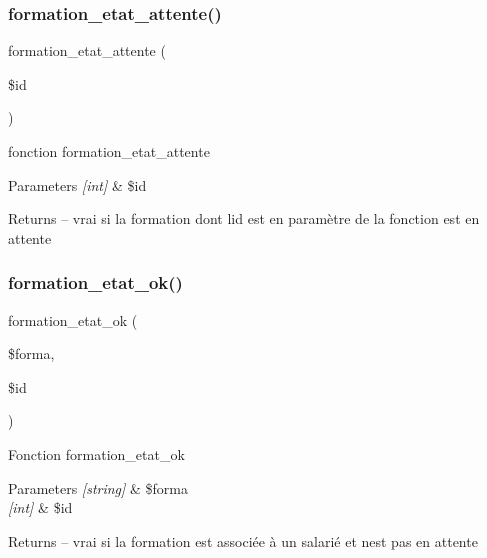 \subsubsection{formation\+\_\+etat\+\_\+attente()}
{\footnotesize\ttfamily formation\+\_\+etat\+\_\+attente (\begin{DoxyParamCaption}\item[{}]{\$id }\end{DoxyParamCaption})}

fonction formation\+\_\+etat\+\_\+attente


\begin{DoxyParams}{Parameters}
{\em \mbox{[}int\mbox{]}} & \$id \\
\hline
\end{DoxyParams}
\begin{DoxyReturn}{Returns}
-- vrai si la formation dont l\textquotesingle{}id est en paramètre de la fonction est en attente 
\end{DoxyReturn}
\mbox{\label{_d_a___formation_8php_aa12612b84ce8697154f9fff827e842be}} 
\subsubsection{formation\+\_\+etat\+\_\+ok()}
{\footnotesize\ttfamily formation\+\_\+etat\+\_\+ok (\begin{DoxyParamCaption}\item[{}]{\$forma,  }\item[{}]{\$id }\end{DoxyParamCaption})}

Fonction formation\+\_\+etat\+\_\+ok


\begin{DoxyParams}{Parameters}
{\em \mbox{[}string\mbox{]}} & \$forma \\
\hline
{\em \mbox{[}int\mbox{]}} & \$id \\
\hline
\end{DoxyParams}
\begin{DoxyReturn}{Returns}
-- vrai si la formation est associée à un salarié et n\textquotesingle{}est pas en attente 
\end{DoxyReturn}
\mbox{\label{_d_a___formation_8php_af594c595ded40a372496fa8d0aca5ef3}} 
